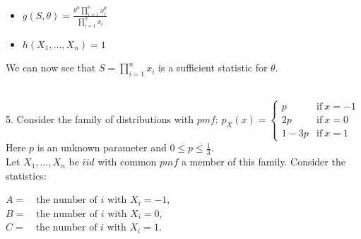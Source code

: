 \documentclass[12pt]{article}
\newcommand{\XB}{\color{black}}
\newcommand{\XBB}{\color{blue}}
\newcommand{\XV}{\color{violet}}
\begin{document}
\begin{itemize}
    \item $ \displaystyle g(S, \theta) = \frac{ \theta^{n} \prod_{i=1}^{n} x_{i}^{\theta} }{ \prod_{i=1}^{n} x_{i} } $
    \item $ \displaystyle h(X_{1}, \dots , X_{n}) = 1 $
\end{itemize}

\noindent
We can now see that $ \displaystyle S = \prod_{i=1}^{n} x_{i} $ is a sufficient statistic for $ \theta $.



\newpage
\XBB\hrulefill\XB \\

5. Consider the family of distributions with $ \displaystyle pmf $: $p_{X}(x) =
\begin{cases}
    p & \text{if} \  x = -1 \\
    2p &  \text{if} \ x = 0 \\
    1 - 3p & \text{if} \ x = 1
\end{cases} $ \\

Here $ p $ is an unknown parameter and $ \displaystyle 0 \leq p \leq \frac{1}{3} $. \\

Let $ X_{1},\dots,X_{n} $ be $ iid $ with common $ pmf $ a member of this family. Consider the statistics:
\begin{center}
    $ A = \quad \text{the number of $i$ with } X_{i} = -1 $, \\
    $ B = \quad \text{the number of $i$ with } X_{i} = 0 $, \\
    $ C = \quad \text{the number of $i$ with } X_{i} = 1 $. \\
\end{center}

\XBB\hrulefill\XB
\vspace{5mm} \\


\end{document}
